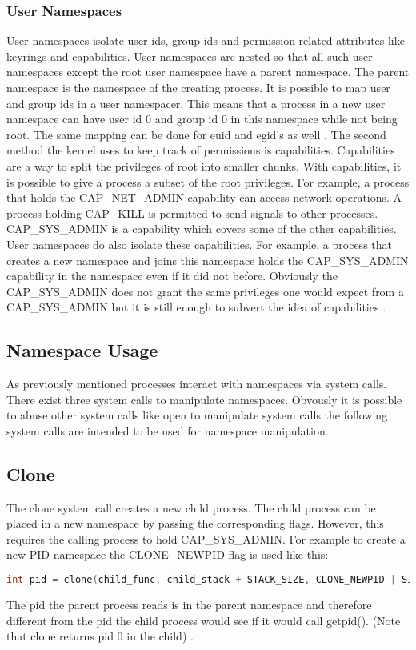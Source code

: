 \documentclass[10pt,twocolumn,a4paper]{article}
\begin{document}
\subsubsection{User Namespaces}
User namespaces isolate user ids, group ids and permission-related attributes like keyrings and
capabilities. User namespaces are nested so that all such user namespaces except the root user namespace
have a parent namespace. The parent namespace is the namespace of the creating process. 
It is possible to map user and group ids in a user namespacer. This means that a process in a new user
namespace can have user id 0 and group id 0 in this namespace while not being root. The same mapping
can be done for euid and egid's as well \cite{18}. The second method the kernel uses to keep track
of permissions is capabilities. Capabilities are a way to split the privileges of root into smaller
chunks. With capabilities, it is possible to give a process a subset of the root
privileges. For example, a process that holds the CAP\_NET\_ADMIN capability can access network
operations. A process holding CAP\_KILL is permitted to send signals to other
processes\cite{19}. CAP\_SYS\_ADMIN is a capability which covers some of the other capabilities. 
User namespaces do also isolate these capabilities. For example, a process that creates a new
namespace and joins this namespace holds the CAP\_SYS\_ADMIN capability in the namespace even if it did not before. 
Obviously the CAP\_SYS\_ADMIN does not grant the same privileges one would expect from
a CAP\_SYS\_ADMIN but it is still enough to subvert the idea of capabilities \cite{20}. 

\subsection{Namespace Usage}
As previously mentioned processes interact with namespaces via system calls. There exist three system calls
to manipulate namespaces. Obvously it is possible to abuse other system calls like open to
manipulate system calls the following system calls are intended to be used for namespace manipulation.  
\subsection{ Clone}
The clone system call creates a new child process. The child process can be placed in a new
namespace by passing the corresponding flags. However, this requires the calling process to hold
CAP\_SYS\_ADMIN. For example to create a new PID namespace the CLONE\_NEWPID flag is used like this:
\begin{lstlisting}[language=C]
    int pid = clone(child_func, child_stack + STACK_SIZE, CLONE_NEWPID | SIGCHLD, NULL);
\end{lstlisting}
The pid the parent process reads is in the parent namespace and therefore different from the pid the
child process would see if it would call getpid(). (Note that clone returns pid 0 in the
child) \cite{22}.
\end{document}
